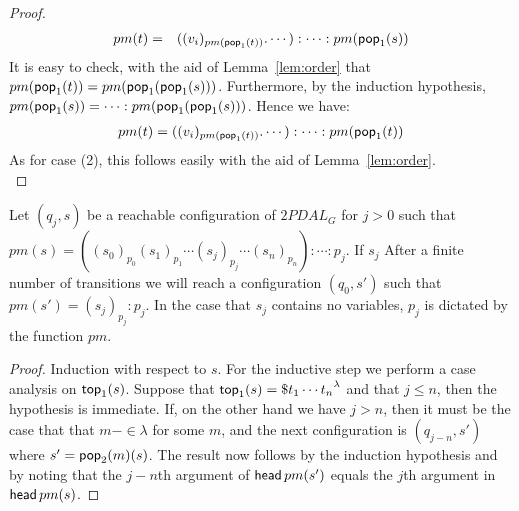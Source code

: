 \begin{proof}
\begin{eqnarray}
\nonumber pm(t) & = & ((v_i)_{pm({\sf pop}_1(t))} . \cdots) : \cdots : pm({\sf pop}_1(s))
\end{eqnarray}
It is easy to check, with the aid of Lemma~\ref{lem:order} that $pm({\sf pop}_1(t)) = pm({\sf pop}_1({\sf pop}_1(s)))$. Furthermore, by the induction hypothesis, $pm({\sf pop}_1(s)) = \cdots : pm({\sf pop}_1({\sf pop}_1(s)))$. Hence we have:
\begin{eqnarray}
\nonumber pm(t) = ((v_i)_{pm({\sf pop}_1(t))} . \cdots) : \cdots :
pm({\sf pop}_1(t))
\end{eqnarray}
As for case (2), this follows easily with the aid of Lemma~\ref{lem:order}.\\
\end{proof}

\begin{lemma}\label{lem:q0}
Let $(q_j,s)$ be a reachable configuration of $2PDAL_G$ for $j>0$
such that $pm(s) = (({s_0})_{p_0}({s_1})_{p_1} \cdots
({s_j})_{p_j} \cdots ({s_n})_{p_n}) : \cdots : p_j$. If $s_j$
After a finite number of transitions we will reach a configuration
$(q_0, s')$ such that $pm(s') = ({s_j})_{p_j}:p_j$. In the case that
$s_j$ contains no variables, $p_j$ is dictated by the function $pm$.
\end{lemma}

\begin{proof}
Induction with respect to $s$. For the inductive step we perform a
case analysis on ${\sf top}_1(s)$. Suppose that ${\sf top}_1(s) = {\$
t_1 \cdots t_n}^{\lambda}$ and that $j \leq n$, then the
hypothesis is immediate. If, on the other hand we have $j > n$,
then it must be the case that that $m- \in \lambda$ for some $m$,
and the next configuration is $(q_{j-n},s')$ where $s' =
{\sf pop}_2(m)(s)$. The result now follows by the induction hypothesis
and by noting that the ${j-n}$th argument of ${\sf head}\,{p}m(s')$ equals
the $j$th argument in ${\sf head}\,{p}m(s)$.
\end{proof}

